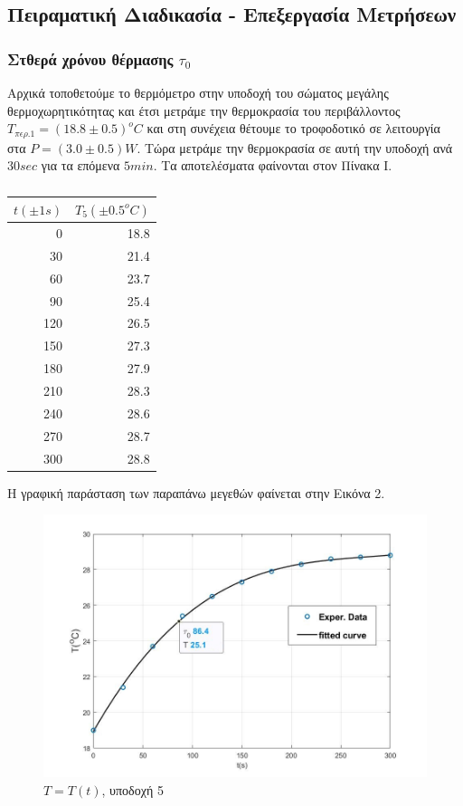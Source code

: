 \documentclass[a4paper]{article}
\begin{document}
\subsection*{Πειραματική Διαδικασία - Επεξεργασία Μετρήσεων}

\subsubsection*{Στθερά χρόνου θέρμασης $\tau_0$}
Αρχικά τοποθετούμε το θερμόμετρο στην υποδοχή του σώματος μεγάλης θερμοχωρητικότητας και έτσι μετράμε την θερμοκρασία του περιβάλλοντος $T_{\pi\epsilon\rho.1} = (18.8\pm0.5)^oC$ και στη συνέχεια θέτουμε το τροφοδοτικό σε λειτουργία στα $P=(3.0\pm0.5)W$. Τώρα μετράμε την θερμοκρασία σε αυτή την υποδοχή ανά $30sec$ για τα επόμενα $5min$. Τα αποτελέσματα φαίνονται στον Πίνακα Ι.
\begin{table}[h!]
\begin{tabular}{r|r}
\centering
\caption{ }
$t(\pm1 s)$ & $T_5(\pm0.5 ^oC)$ \\ 
\hline\hline
0&18.8\\
30&21.4\\
60&23.7\\
90&25.4\\
120&26.5\\
150&27.3\\
180&27.9\\
210&28.3\\
240&28.6\\
270&28.7\\
300&28.8\\
\end{tabular}
\end{table}

Η γραφική παράσταση των παραπάνω μεγεθών φαίνεται στην Εικόνα 2.
\begin{figure}[h!]
\centering
\caption{ $T=T(t)$, υποδοχή 5}
\includegraphics[scale=0.7]{t0.jpg}
\end{figure}
\end{document}
